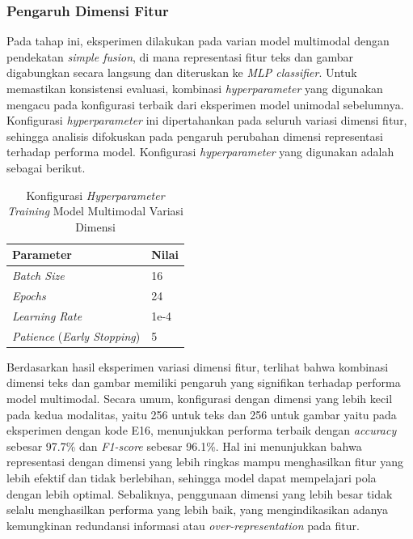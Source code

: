 \subsubsection{Pengaruh Dimensi Fitur}
\label{IV.Multimodal Dimensi}
Pada tahap ini, eksperimen dilakukan pada varian model multimodal dengan pendekatan \textit{simple fusion}, di mana representasi fitur teks dan gambar digabungkan secara langsung dan diteruskan ke \textit{MLP classifier}. Untuk memastikan konsistensi evaluasi, kombinasi \textit{hyperparameter} yang digunakan mengacu pada konfigurasi terbaik dari eksperimen model unimodal sebelumnya. Konfigurasi \textit{hyperparameter} ini dipertahankan pada seluruh variasi dimensi fitur, sehingga analisis difokuskan pada pengaruh perubahan dimensi representasi terhadap performa model. Konfigurasi \textit{hyperparameter} yang digunakan adalah sebagai berikut.

\begin{table}[H]
    \centering
    \caption{Konfigurasi \textit{Hyperparameter Training} Model Multimodal Variasi Dimensi}
    \label{table:hyperparams_terpilih}
    \small
    \setlength{\tabcolsep}{3pt}
    \renewcommand{\arraystretch}{1.1}
    \begin{tabular}{p{5.0cm} p{3.0cm}}
        \hline
        \textbf{Parameter} & \textbf{Nilai} \\
        \hline
        \textit{Batch Size} & 16 \\
        \textit{Epochs} & 24 \\
        \textit{Learning Rate} & 1e-4 \\
        \textit{Patience} (\textit{Early Stopping}) & 5 \\
        \hline
    \end{tabular}
\end{table}

Berdasarkan hasil eksperimen variasi dimensi fitur, terlihat bahwa kombinasi dimensi teks dan gambar memiliki pengaruh yang signifikan terhadap performa model multimodal. Secara umum, konfigurasi dengan dimensi yang lebih kecil pada kedua modalitas, yaitu 256 untuk teks dan 256 untuk gambar yaitu pada eksperimen dengan kode E16, menunjukkan performa terbaik dengan \textit{accuracy} sebesar 97.7\% dan \textit{F1-score} sebesar 96.1\%. Hal ini menunjukkan bahwa representasi dengan dimensi yang lebih ringkas mampu menghasilkan fitur yang lebih efektif dan tidak berlebihan, sehingga model dapat mempelajari pola dengan lebih optimal. Sebaliknya, penggunaan dimensi yang lebih besar tidak selalu menghasilkan performa yang lebih baik, yang mengindikasikan adanya kemungkinan redundansi informasi atau \textit{over-representation} pada fitur.

